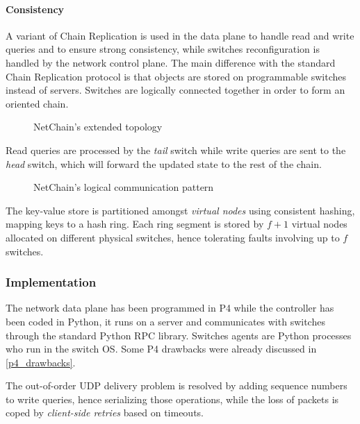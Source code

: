 \paragraph{Consistency}
A variant of Chain Replication \cite{chainreplication} is used in the data plane to handle read and write queries and to ensure strong consistency, while switches reconfiguration is handled by the network control plane.
The main difference with the standard Chain Replication \cite{chainreplication} protocol is that objects are stored on programmable switches instead of servers.
Switches are logically connected together in order to form an oriented chain.

\begin{figure}[!htb]
    \centering
    \usebox{\netchainextended}
    \caption{NetChain's \texorpdfstring{\cite{netchain}}{} extended topology}
\end{figure}

Read queries are processed by the \textit{tail} switch while write queries are sent to the \textit{head} switch, which will forward the updated state to the rest of the chain.

\begin{figure}[!htb]
    \centering
    \usebox{\netchaincommunication}
    \caption{NetChain's \texorpdfstring{\cite{netchain}}{} logical communication pattern}
\end{figure}

The key-value store is partitioned amongst \textit{virtual nodes} using consistent hashing, mapping keys to a hash ring.
Each ring segment is stored by $f + 1$ virtual nodes allocated on different physical switches, hence tolerating faults involving up to $f$ switches.

\subsubsection{Implementation}
The network data plane has been programmed in P4 \cite{p4} while the controller has been coded in Python, it runs on a server and communicates with switches through the standard Python RPC library.
Switches agents are Python processes who run in the switch OS. Some P4 \cite{p4} drawbacks were already discussed in \cref{p4_drawbacks}.\par
The out-of-order UDP delivery problem is resolved by adding sequence numbers to write queries, hence serializing those operations, while the loss of packets is coped by \textit{client-side retries} based on timeouts.

